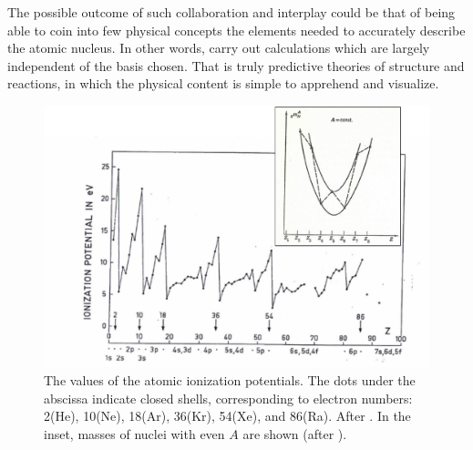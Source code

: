 \documentclass[a4paper,11pt]{book}
\numberwithin{equation}{section}
\numberwithin{figure}{section}
\numberwithin{table}{section}
\begin{document}
The possible outcome of such collaboration and interplay could be that of being able to coin into few physical concepts the elements needed to accurately describe the atomic nucleus. In other words, carry out  calculations which are largely independent of the basis chosen. That is   truly predictive theories of structure and reactions, in which the physical content is simple to apprehend and visualize. 
\begin{figure}
\centerline {
\includegraphics*[width=12cm]{introduccion/figs/figpreface1}
}
\caption{The values of the atomic ionization potentials. The dots under the abscissa indicate closed shells, corresponding to electron numbers: 2(He), 10(Ne), 18(Ar), 36(Kr), 54(Xe), and 86(Ra). After \cite{Bohr:69}. In the inset, masses of nuclei with even $A$ are shown (after \cite{Mayer:55}).}
\label{fig1.0.1}
\end{figure}
\end{document}

